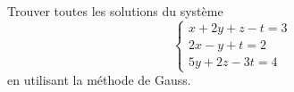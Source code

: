 \begin{exercice}\label{exoTP50002}

	Trouver toutes les solutions du système
	\begin{equation}	
		\left\{
		\begin{array}{ll}
			x+2y+z-t=3\\
			2x-y+t=2\\
			5y+2z-3t=4
		\end{array}
		\right.
	\end{equation}
	en utilisant la méthode de Gauss.

\end{exercice}

